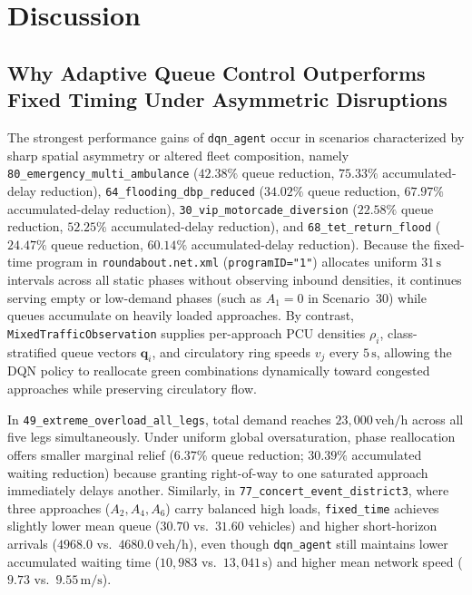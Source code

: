 \section{Discussion}\label{s:7}

\subsection{Why Adaptive Queue Control Outperforms Fixed Timing Under Asymmetric Disruptions}

The strongest performance gains of \texttt{dqn\_agent} occur in scenarios characterized by sharp spatial asymmetry or altered fleet composition, namely \texttt{80\_emergency\_multi\_ambulance} ($42.38\%$ queue reduction, $75.33\%$ accumulated-delay reduction), \texttt{64\_flooding\_dbp\_reduced} ($34.02\%$ queue reduction, $67.97\%$ accumulated-delay reduction), \texttt{30\_vip\_motorcade\_diversion} ($22.58\%$ queue reduction, $52.25\%$ accumulated-delay reduction), and \texttt{68\_tet\_return\_flood} ($24.47\%$ queue reduction, $60.14\%$ accumulated-delay reduction). Because the fixed-time program in \texttt{roundabout.net.xml} (\texttt{programID="1"}) allocates uniform $31\,\mathrm{s}$ intervals across all static phases without observing inbound densities, it continues serving empty or low-demand phases (such as $A_1=0$ in Scenario~30) while queues accumulate on heavily loaded approaches. By contrast, \texttt{MixedTrafficObservation} supplies per-approach PCU densities $\rho_i$, class-stratified queue vectors $\mathbf{q}_i$, and circulatory ring speeds $v_j$ every $5\,\mathrm{s}$, allowing the DQN policy to reallocate green combinations dynamically toward congested approaches while preserving circulatory flow.

In \texttt{49\_extreme\_overload\_all\_legs}, total demand reaches $23{,}000\,\mathrm{veh/h}$ across all five legs simultaneously. Under uniform global oversaturation, phase reallocation offers smaller marginal relief ($6.37\%$ queue reduction; $30.39\%$ accumulated waiting reduction) because granting right-of-way to one saturated approach immediately delays another. Similarly, in \texttt{77\_concert\_event\_district3}, where three approaches ($A_2, A_4, A_6$) carry balanced high loads, \texttt{fixed\_time} achieves slightly lower mean queue ($30.70$ vs.\ $31.60$ vehicles) and higher short-horizon arrivals ($4968.0$ vs.\ $4680.0\,\mathrm{veh/h}$), even though \texttt{dqn\_agent} still maintains lower accumulated waiting time ($10{,}983$ vs.\ $13{,}041\,\mathrm{s}$) and higher mean network speed ($9.73$ vs.\ $9.55\,\mathrm{m/s}$).

